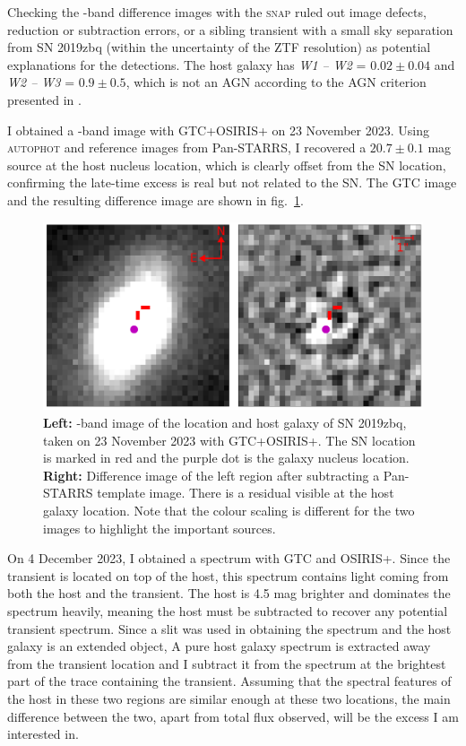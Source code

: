 \documentclass[a4paper,oneside,12pt, class=Latex/Classes/PhDthesisPSnPDF, crop=false]{standalone}
\begin{document}
Checking the \ztfr-band difference images with the \textsc{snap} ruled out image defects, reduction or subtraction errors, or a sibling transient with a small sky separation from SN 2019zbq (within the uncertainty of the ZTF resolution) as potential explanations for the detections. The host galaxy has \textit{W1 -- W2} = $0.02\pm 0.04$ and  \textit{W2 -- W3} = $0.9\pm 0.5$, which is not an AGN according to the AGN criterion presented in \citet{WISE_crit}.

I obtained a \ztfr-band image with GTC+OSIRIS+ on 23 November 2023. Using \textsc{autophot} and reference images from Pan-STARRS, I recovered a $20.7\pm0.1$ mag source at the host nucleus location, which is clearly offset from the SN location, confirming the late-time excess is real but not related to the SN. The GTC image and the resulting difference image are shown in fig.~\ref{2019zbq_difim}.

\begin{figure}
    \centering
    \includegraphics[width=\textwidth]{../Images/chapter_5/2020zbq_difim.png}
    \caption{\textbf{Left:} \ztfr-band image of the location and host galaxy of SN 2019zbq, taken on 23 November 2023 with GTC+OSIRIS+. The SN location is marked in red and the purple dot is the galaxy nucleus location. \textbf{Right:} Difference image of the left region after subtracting a Pan-STARRS template image. There is a residual visible at the host galaxy location. Note that the colour scaling is different for the two images to highlight the important sources.}
    \label{2019zbq_difim}
\end{figure}

On 4 December 2023, I obtained a spectrum with GTC and OSIRIS+. Since the transient is located on top of the host, this spectrum contains light coming from both the host and the transient. The host is 4.5 mag brighter and dominates the spectrum heavily, meaning the host must be subtracted to recover any potential transient spectrum. Since a slit was used in obtaining the spectrum and the host galaxy is an extended object, A pure host galaxy spectrum is extracted away from the transient location and I subtract it from the spectrum at the brightest part of the trace containing the transient. Assuming that the spectral features of the host in these two regions are similar enough at these two locations, the main difference between the two, apart from total flux observed, will be the excess I am interested in.
\end{document}
